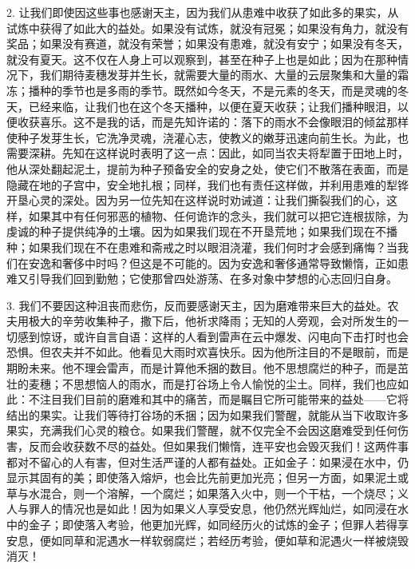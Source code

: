 2. 让我们即使因这些事也感谢天主，因为我们从患难中收获了如此多的果实，从试炼中获得了如此大的益处。如果没有试炼，就没有冠冕；如果没有角力，就没有奖品；如果没有赛道，就没有荣誉；如果没有患难，就没有安宁；如果没有冬天，就没有夏天。这不仅在人身上可以观察到，甚至在种子上也是如此；因为在那种情况下，我们期待麦穗发芽并生长，就需要大量的雨水、大量的云层聚集和大量的霜冻；播种的季节也是多雨的季节。既然如今冬天，不是元素的冬天，而是灵魂的冬天，已经来临，让我们也在这个冬天播种，以便在夏天收获；让我们播种眼泪，以便收获喜乐。这不是我的话，而是先知许诺的：落下的雨水不会像眼泪的倾盆那样使种子发芽生长，它洗净灵魂，浇灌心志，使教义的嫩芽迅速向前生长。为此，也需要深耕。先知在这样说时表明了这一点：因此，如同当农夫将犁置于田地上时，他从深处翻起泥土，提前为种子预备安全的安身之处，使它们不散落在表面，而是隐藏在地的子宫中，安全地扎根；同样，我们也有责任这样做，并利用患难的犁铧开垦心灵的深处。因为另一位先知在这样说时劝诫道：让我们撕裂我们的心，这样，如果其中有任何邪恶的植物、任何诡诈的念头，我们就可以把它连根拔除，为虔诚的种子提供纯净的土壤。因为如果我们现在不开垦荒地；如果我们现在不播种；如果我们现在不在患难和斋戒之时以眼泪浇灌，我们何时才会感到痛悔？当我们在安逸和奢侈中时吗？但这是不可能的。因为安逸和奢侈通常导致懒惰，正如患难又引导我们回到勤勉；它使那曾四处游荡、在多对象中梦想的心志回归自身。\par

3. 我们不要因这种沮丧而悲伤，反而要感谢天主，因为磨难带来巨大的益处。农夫用极大的辛劳收集种子，撒下后，他祈求降雨；无知的人旁观，会对所发生的一切感到惊讶，或许自言自语：这样的人看到雷声在云中爆发、闪电向下击打时也会恐惧。但农夫并不如此。他看见大雨时欢喜快乐。因为他所注目的不是眼前，而是期盼未来。他不理会雷声，而是计算他禾捆的数目。他不思想腐烂的种子，而是茁壮的麦穗；不思想恼人的雨水，而是打谷场上令人愉悦的尘土。同样，我们也应如此：不注目我们目前的磨难和其中的痛苦，而是瞩目它所可能带来的益处——它将结出的果实。让我们等待打谷场的禾捆；因为如果我们警醒，就能从当下收取许多果实，充满我们心灵的粮仓。如果我们警醒，就不仅完全不会因这磨难受到任何伤害，反而会收获数不尽的益处。但如果我们懒惰，连平安也会毁灭我们！这两件事都对不留心的人有害，但对生活严谨的人都有益处。正如金子：如果浸在水中，仍显示其固有的美；即使落入熔炉，也会比先前更加光亮；但另一方面，如果泥土或草与水混合，则一个溶解，一个腐烂；如果落入火中，则一个干枯，一个烧尽；义人与罪人的情况也是如此！因为如果义人享受安息，他仍然光辉灿烂，如同浸在水中的金子；即使落入考验，他更加光辉，如同经历火的试炼的金子；但罪人若得享安息，便如同草和泥遇水一样软弱腐烂；若经历考验，便如草和泥遇火一样被烧毁消灭！\par

